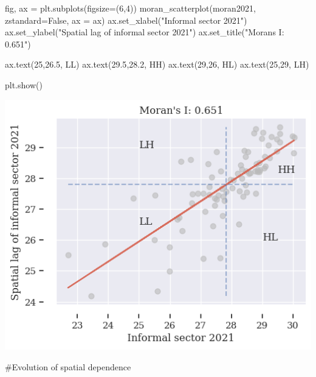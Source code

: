 \documentclass[
  letterpaper,
  DIV=11,
  numbers=noendperiod]{scrreprt}
\newenvironment{Shaded}{\begin{snugshade}}{\end{snugshade}}
\newcommand{\CommentTok}[1]{\textcolor[rgb]{0.37,0.37,0.37}{#1}}
\newcommand{\DecValTok}[1]{\textcolor[rgb]{0.68,0.00,0.00}{#1}}
\newcommand{\FloatTok}[1]{\textcolor[rgb]{0.68,0.00,0.00}{#1}}
\newcommand{\NormalTok}[1]{\textcolor[rgb]{0.00,0.23,0.31}{#1}}
\newcommand{\OperatorTok}[1]{\textcolor[rgb]{0.37,0.37,0.37}{#1}}
\newcommand{\StringTok}[1]{\textcolor[rgb]{0.13,0.47,0.30}{#1}}
\newcommand{\VariableTok}[1]{\textcolor[rgb]{0.07,0.07,0.07}{#1}}
\begin{document}
\begin{Shaded}
\begin{Highlighting}[]
\NormalTok{fig, ax }\OperatorTok{=}\NormalTok{ plt.subplots(figsize}\OperatorTok{=}\NormalTok{(}\DecValTok{6}\NormalTok{,}\DecValTok{4}\NormalTok{))}
\NormalTok{moran\_scatterplot(moran2021, zstandard}\OperatorTok{=}\VariableTok{False}\NormalTok{, ax }\OperatorTok{=}\NormalTok{ ax)}
\NormalTok{ax.set\_xlabel(}\StringTok{"Informal sector 2021"}\NormalTok{)}
\NormalTok{ax.set\_ylabel(}\StringTok{"Spatial lag of informal sector 2021"}\NormalTok{)}
\NormalTok{ax.set\_title(}\StringTok{"Moran\textquotesingle{}s I: 0.651"}\NormalTok{)}

\NormalTok{ax.text(}\DecValTok{25}\NormalTok{,}\FloatTok{26.5}\NormalTok{, }\StringTok{\textquotesingle{}LL\textquotesingle{}}\NormalTok{)}
\NormalTok{ax.text(}\FloatTok{29.5}\NormalTok{,}\FloatTok{28.2}\NormalTok{, }\StringTok{\textquotesingle{}HH\textquotesingle{}}\NormalTok{)}
\NormalTok{ax.text(}\DecValTok{29}\NormalTok{,}\DecValTok{26}\NormalTok{, }\StringTok{\textquotesingle{}HL\textquotesingle{}}\NormalTok{)}
\NormalTok{ax.text(}\DecValTok{25}\NormalTok{,}\DecValTok{29}\NormalTok{, }\StringTok{\textquotesingle{}LH\textquotesingle{}}\NormalTok{)}


\NormalTok{plt.show()}
\end{Highlighting}
\end{Shaded}

\includegraphics{labs/final_informal_files/figure-pdf/cell-18-output-1.png}

\begin{Shaded}
\begin{Highlighting}[]
\CommentTok{\#Evolution of spatial dependence}
\end{Highlighting}
\end{Shaded}
\end{document}
